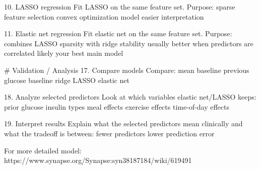 10. LASSO regression
Fit LASSO on the same feature set.
Purpose:
    sparse feature selection
    convex optimization model
    easier interpretation

11. Elastic net regression
Fit elastic net on the same feature set.
Purpose:
    combines LASSO sparsity with ridge stability
    usually better when predictors are correlated
    likely your best main model


# Validation / Analysis
17. Compare models
Compare:
    mean baseline
    previous glucose baseline
    ridge
    LASSO
    elastic net

18. Analyze selected predictors
Look at which variables elastic net/LASSO keeps:
    prior glucose
    insulin types
    meal effects
    exercise effects
    time-of-day effects

19. Interpret results
Explain what the selected predictors mean clinically and what the tradeoff is between:
    fewer predictors
    lower prediction error


For more detailed model:
https://www.synapse.org/Synapse:syn38187184/wiki/619491